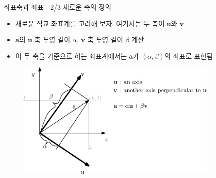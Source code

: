 \begin{frame}{좌표축과 좌표 - 2/3 새로운 축의 정의}

\begin{itemize}
\item 새로운 직교 좌표계를 고려해 보자. 여기서는 두 축이 $\mathbf u$와 $\mathbf v$
\item $\mathbf a$의 $\mathbf u$ 축 투영 길이 $\alpha$, $\mathbf v$ 축 투영 길이 $\beta$ 계산
\item 이 두 축을 기준으로 하는 좌표계에서는 $\mathbf a$가 $(\alpha, \beta)$의 좌표로 표현됨
\end{itemize}


\begin{figure}
\includegraphics[width=10cm]{Math_vector/vectorComponentsArb.eps}
\end{figure}

\end{frame}

